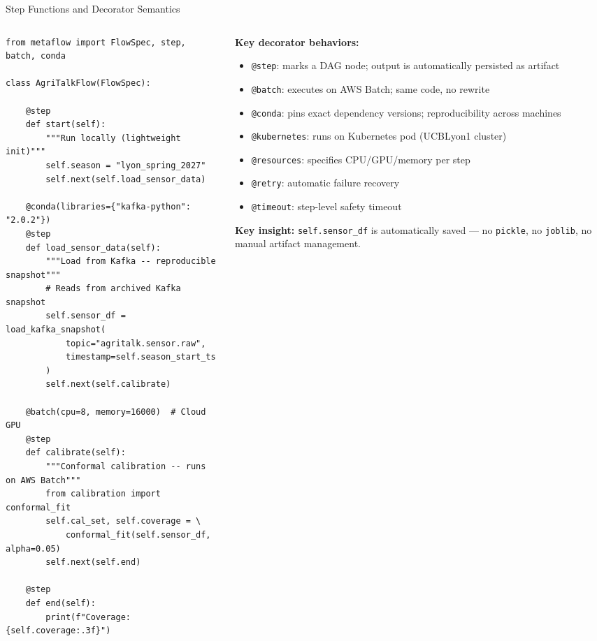 \documentclass[10pt,aspectratio=169]{beamer}
\newcommand{\Key}[1]{\textcolor{mfblue}{\textbf{#1}}}
\begin{document}
\begin{frame}[fragile]{Step Functions and Decorator Semantics}

\begin{columns}
\begin{column}{0.58\textwidth}
\begin{lstlisting}[title={\scriptsize Decorator semantics: same code, different compute}]
from metaflow import FlowSpec, step, batch, conda

class AgriTalkFlow(FlowSpec):

    @step
    def start(self):
        """Run locally (lightweight init)"""
        self.season = "lyon_spring_2027"
        self.next(self.load_sensor_data)

    @conda(libraries={"kafka-python": "2.0.2"})
    @step
    def load_sensor_data(self):
        """Load from Kafka -- reproducible snapshot"""
        # Reads from archived Kafka snapshot
        self.sensor_df = load_kafka_snapshot(
            topic="agritalk.sensor.raw",
            timestamp=self.season_start_ts
        )
        self.next(self.calibrate)

    @batch(cpu=8, memory=16000)  # Cloud GPU
    @step
    def calibrate(self):
        """Conformal calibration -- runs on AWS Batch"""
        from calibration import conformal_fit
        self.cal_set, self.coverage = \
            conformal_fit(self.sensor_df, alpha=0.05)
        self.next(self.end)

    @step
    def end(self):
        print(f"Coverage: {self.coverage:.3f}")
\end{lstlisting}
\end{column}
\begin{column}{0.39\textwidth}
\small
\textbf{Key decorator behaviors:}
\begin{itemize}
  \item \texttt{@step}: marks a DAG node; output is automatically persisted as artifact
  \item \texttt{@batch}: executes on AWS Batch; same code, no rewrite
  \item \texttt{@conda}: pins exact dependency versions; reproducibility across machines
  \item \texttt{@kubernetes}: runs on Kubernetes pod (UCBLyon1 cluster)
  \item \texttt{@resources}: specifies CPU/GPU/memory per step
  \item \texttt{@retry}: automatic failure recovery
  \item \texttt{@timeout}: step-level safety timeout
\end{itemize}

\vspace{0.3cm}
\Key{Key insight:} \texttt{self.sensor\_df} is automatically saved --- no \texttt{pickle}, no \texttt{joblib}, no manual artifact management.
\end{column}
\end{columns}

\end{frame}
\end{document}

